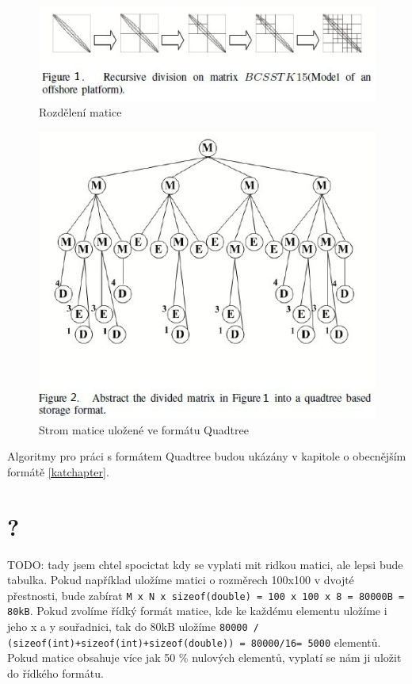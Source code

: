 \begin{figure}[H]\centering
	\includegraphics[width=\textwidth]{./images/quadtree_sourceforge/figure4}
	\caption{Rozdělení matice}
	\label{fig:BSR}
\end{figure}

\begin{figure}[H]\centering
	\includegraphics[width=\textwidth]{./images/quadtree_sourceforge/figure5}
	\caption{Strom matice uložené ve formátu Quadtree}
	\label{fig:BSR}
\end{figure}

Algoritmy pro práci s formátem Quadtree budou ukázány v kapitole o obecnějším formátě \ref{katchapter}.

\section{?}

TODO: tady jsem chtel spocictat kdy  se vyplati mit ridkou matici, ale lepsi bude tabulka. Pokud například uložíme matici o rozměrech 100x100 v dvojté přestnosti, bude zabírat \texttt{M x N x sizeof(double) = 100 x 100 x 8 = 80000B = 80kB}. Pokud zvolíme řídký formát matice, kde ke každému elementu uložíme i jeho x a y souřadnici, tak do 80kB uložíme \texttt{80000 / (sizeof(int)+sizeof(int)+sizeof(double)) = 80000/16= 5000} elementů. Pokud matice obsahuje více jak 50  \% nulových elementů, vyplatí se nám ji uložit do řídkého formátu.

